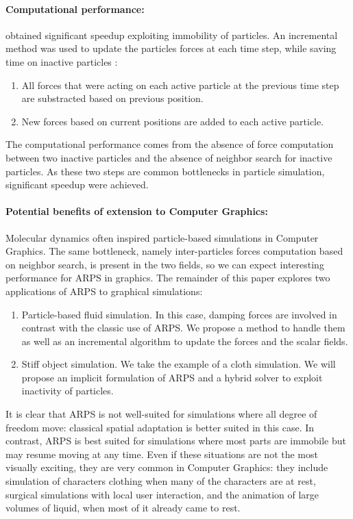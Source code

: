 \paragraph*{Computational performance:}
\cite{Artemova2012} obtained significant speedup exploiting immobility of particles.
An incremental method was used to update the particles forces at each time step, while saving time on inactive particles :
\begin{enumerate}
    \item All forces that were acting on each active particle at the previous time step are substracted based on previous position.
    \item New forces based on current positions are added to each active particle.
\end{enumerate}
The computational performance comes from the absence of force computation between
two inactive particles and the absence of neighbor search for inactive particles.
As these two steps are common bottlenecks in particle simulation, significant speedup were achieved.

\paragraph*{Potential benefits of extension to Computer Graphics:}
Molecular dynamics often inspired particle-based simulations in Computer Graphics. The same bottleneck, namely inter-particles forces computation based on neighbor search, is present in the two fields, so we can expect interesting performance for ARPS in graphics. The remainder of this paper explores two applications of ARPS to graphical simulations:
\begin{enumerate}
\item Particle-based fluid simulation. In this case, damping forces are involved in contrast with the classic use of ARPS.
We propose a method to handle them as well as an incremental algorithm to update the forces and the scalar fields.
\item Stiff object simulation. We take the example of a cloth simulation.
We will propose an implicit formulation of ARPS and a hybrid solver to exploit inactivity of particles.
\end{enumerate}
It is clear that ARPS is not well-suited for simulations where all degree of freedom move: classical spatial adaptation is better suited in this case. In contrast, ARPS is best suited for simulations where most parts are immobile but may resume moving at any time. Even if these situations are not the most visually exciting, they are very common in Computer Graphics: they include simulation of characters clothing when many of the characters are at rest, surgical simulations with local user interaction, and the animation of large volumes of liquid, when most of it already came to rest.





